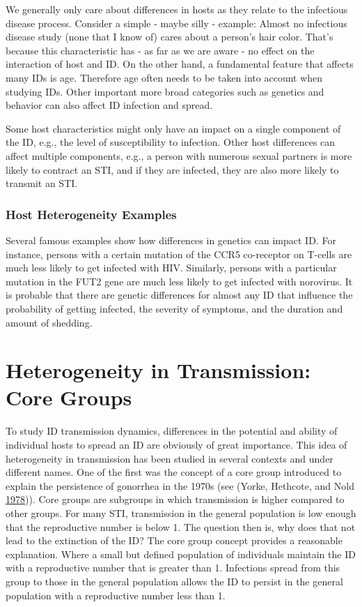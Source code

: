 \documentclass[]{book}
\theoremstyle{definition}
\theoremstyle{definition}
\theoremstyle{definition}
\theoremstyle{remark}
\begin{document}
We generally only care about differences in hosts as they relate to the
infectious disease process. Consider a simple - maybe silly - example:
Almost no infectious disease study (none that I know of) cares about a
person's hair color. That's because this characteristic has - as far as
we are aware - no effect on the interaction of host and ID. On the other
hand, a fundamental feature that affects many IDs is age. Therefore age
often needs to be taken into account when studying IDs. Other important
more broad categories such as genetics and behavior can also affect ID
infection and spread.

Some host characteristics might only have an impact on a single
component of the ID, e.g., the level of susceptibility to infection.
Other host differences can affect multiple components, e.g., a person
with numerous sexual partners is more likely to contract an STI, and if
they are infected, they are also more likely to transmit an STI.

\subsubsection{Host Heterogeneity Examples}\label{myexamplebox}

Several famous examples show how differences in genetics can impact ID.
For instance, persons with a certain mutation of the CCR5 co-receptor on
T-cells are much less likely to get infected with HIV. Similarly,
persons with a particular mutation in the FUT2 gene are much less likely
to get infected with norovirus. It is probable that there are genetic
differences for almost any ID that influence the probability of getting
infected, the severity of symptoms, and the duration and amount of
shedding.

\section{Heterogeneity in Transmission: Core
Groups}\label{heterogeneity-in-transmission-core-groups}

To study ID transmission dynamics, differences in the potential and
ability of individual hosts to spread an ID are obviously of great
importance. This idea of heterogeneity in transmission has been studied
in several contexts and under different names. One of the first was the
concept of a core group introduced to explain the persistence of
gonorrhea in the 1970s (see (Yorke, Hethcote, and Nold
\protect\hyperlink{ref-yorke78}{1978})). Core groups are subgroups in
which transmission is higher compared to other groups. For many STI,
transmission in the general population is low enough that the
reproductive number is below 1. The question then is, why does that not
lead to the extinction of the ID? The core group concept provides a
reasonable explanation. Where a small but defined population of
individuals maintain the ID with a reproductive number that is greater
than 1. Infections spread from this group to those in the general
population allows the ID to persist in the general population with a
reproductive number less than 1.
\end{document}
